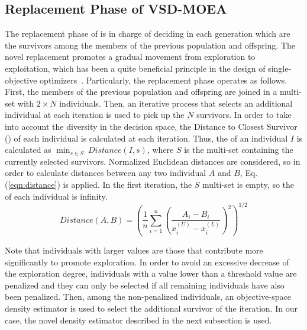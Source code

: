 \subsection{Replacement Phase of VSD-MOEA}

The replacement phase of \EAS{} is in charge of deciding in each generation which are the survivors 
among the members of the previous population and offspring.
%
The novel replacement promotes a gradual movement from exploration to exploitation, which has been a quite 
beneficial principle in the design of single-objective optimizers~\cite{Joel:MULTI_DYNAMIC}.
%
Particularly, the replacement phase operates as follows.
%
First, the members of the previous population and offspring are joined in a multi-set with $2 \times N$ individuals.
%
%
%
Then, an iterative process that selects an additional
individual at each iteration is used to pick up the $N$ survivors. 
%
In order to take into account the diversity in the decision space, the Distance to Closest Survivor (\DCS{}) of each
individual is calculated at each iteration.
%
Thus, the \DCS{} of an individual $I$ is calculated as $\displaystyle{\min_{s \in S}\ Distance(I, s)}$,
where $S$ is the multi-set containing the currently selected survivors. 
%
Normalized Euclidean distances are considered, so in order to calculate distances between any two individual $A$ and $B$, 
Eq. (\ref{eqn:distance}) is applied.
%
In the first iteration, the $S$ multi-set is empty, so the \DCS{} of each individual is infinity.
%
\begin{equation}\label{eqn:distance}
Distance(A, B) =   \left ( \frac{1}{n}  \sum_{i=1}^n \left ( \frac{A_i - B_i}{x_i^{(U)} - x_i^{(L)}} \right )^2  \right)^{1/2}
\end{equation}

Note that individuals with larger \DCS{} values are those that contribute more significantly to promote exploration.
%
In order to avoid an excessive decrease of the exploration degree, individuals with a \DCS{} value lower 
than a threshold value are penalized and they can only be selected if all remaining individuals have also been penalized.
%
Then, among the non-penalized individuals, an objective-space density estimator is used to select the additional
survivor of the iteration.
%
In our case, the novel density estimator described in the next subsection is used. 


